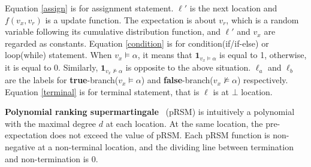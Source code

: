 \documentclass[conference]{IEEEtran}
\begin{document}
 Equation \eqref{assign} is for assignment statement. $\ell'$ is the next location and $f(v_x,v_r)$ is a update function. The expectation is about $v_r$, which is a random variable following its cumulative distribution function, and $\ell'$ and $v_x$ are regarded as constants.  
 Equation \eqref{condition} is for condition(if/if-else) or loop(while) statement. When $v_x \vDash\alpha$, it means that $\boldsymbol{1}_{v_x\vDash\alpha}$ is equal to 1, otherwise, it is equal to 0. Similarly, $\boldsymbol{1}_{v_x\nvDash\alpha}$ is opposite to the above situation. $\ell_a$ and $\ell_b$ are the labels for \textbf{true}-branch($v_x\vDash\alpha$) and \textbf{false}-branch($v_x\nvDash\alpha$) respectively. 
 Equation \eqref{terminal} is for terminal statement, that is $\ell$ is at $\bot$ location.
 
 \textbf{Polynomial ranking supermartingale}~\cite{Chakarov2013Martingales} (pRSM) is intuitively a polynomial with the maximal degree $d$ at each location. At the same location, the pre-expectation does not exceed the value of pRSM. Each pRSM function is non-negative at a non-terminal location, and the dividing line between termination and non-termination is 0.
 
\end{document}
